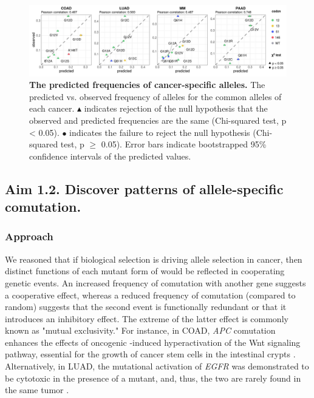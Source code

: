 \begin{figure}[t]
\centering
\includegraphics[width=180mm]{figures/aim1/Fig_2.jpeg}
\caption{
    \textbf{The predicted frequencies of cancer-specific \KRAS{} alleles.}
    The predicted vs. observed frequency of \KRAS{} alleles for the common alleles of each cancer. $\blacktriangle$ indicates rejection of the null hypothesis that the observed and predicted frequencies are the same (Chi-squared test, p < 0.05). $\bullet$ indicates the failure to reject the null hypothesis (Chi-squared test, p $\ge$ 0.05). Error bars indicate bootstrapped 95\% confidence intervals of the predicted values.
}
\label{fig:obs-vs-pred}
\end{figure}



\subsection*{Aim 1.2. Discover patterns of allele-specific comutation.}


\subsubsection*{Approach}

We reasoned that if biological selection is driving \KRAS{} allele selection in cancer, then distinct functions of each mutant form of \kras{} would be reflected in cooperating genetic events. 
An increased frequency of comutation with another gene suggests a cooperative effect, whereas a reduced frequency of comutation (compared to random) suggests that the second event is functionally redundant or that it introduces an inhibitory effect.
The extreme of the latter effect is commonly known as "mutual exclusivity."
For instance, in COAD, \emph{APC} comutation enhances the effects of oncogenic \KRAS{}-induced hyperactivation of the Wnt signaling pathway, essential for the growth of cancer stem cells in the intestinal crypts \cite{Janssen2006, Fearon2014, Sakai2018, Jauhri2017}.
Alternatively, in LUAD, the mutational activation of \emph{EGFR} was demonstrated to be cytotoxic in the presence of a \KRAS{} mutant, and, thus, the two are rarely found in the same tumor \cite{Unni2015EvidenceAdenocarcinoma., Ambrogio2017InAdenocarcinoma.}.

